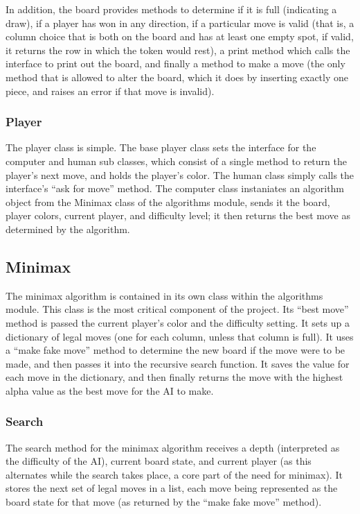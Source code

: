 \documentclass[12pt, article]{scrartcl}
\begin{document}
In addition, the board provides methods to determine if it is full (indicating a draw), if a player has won in any direction, if a particular move is valid (that is, a column choice that is both on the board and has at least one empty spot, if valid, it returns the row in which the token would rest), a print method which calls the interface to print out the board, and finally a method to make a move (the only method that is allowed to alter the board, which it does by inserting exactly one piece, and raises an error if that move is invalid).

\subsubsection{Player}
The player class is simple. The base player class sets the interface for the computer and human sub classes, which consist of a single method to return the player's next move, and holds the player's color. The human class simply calls the interface's ``ask for move'' method. The computer class instaniates an algorithm object from the Minimax class of the algorithms module, sends it the board, player colors, current player, and difficulty level; it then returns the best move as determined by the algorithm.

\subsection{Minimax}
The minimax algorithm is contained in its own class within the algorithms module. This class is the most critical component of the project. Its ``best move'' method is passed the current player's color and the difficulty setting. It sets up a dictionary of legal moves (one for each column, unless that column is full). It uses a ``make fake move'' method to determine the new board if the move were to be made, and then passes it into the recursive search function. It saves the value for each move in the dictionary, and then finally returns the move with the highest alpha value as the best move for the AI to make.

\subsubsection{Search}
The search method for the minimax algorithm receives a depth (interpreted as the difficulty of the AI), current board state, and current player (as this alternates while the search takes place, a core part of the need for minimax). It stores the next set of legal moves in a list, each move being represented as the board state for that move (as returned by the ``make fake move'' method).
\end{document}
